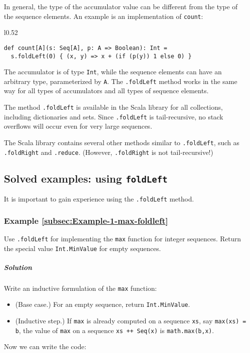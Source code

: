 In general, the type of the accumulator value can be different from
the type of the sequence elements. An example is an implementation
of \lstinline!count!:

\begin{wrapfigure}{l}{0.52\columnwidth}%
\vspace{-0.5\baselineskip}
\begin{lstlisting}
def count[A](s: Seq[A], p: A => Boolean): Int =
  s.foldLeft(0) { (x, y) => x + (if (p(y)) 1 else 0) }
\end{lstlisting}

\vspace{-0.75\baselineskip}
\end{wrapfigure}%

\noindent The accumulator is of type \lstinline!Int!, while the sequence
elements can have an arbitrary type, parameterized by \lstinline!A!.
The \lstinline!.foldLeft! method works in the same way for all types
of accumulators and all types of sequence elements.

The method \lstinline!.foldLeft! is available in the Scala library
for all collections, including dictionaries and sets. Since \lstinline!.foldLeft!
is tail-recursive, no stack overflows will occur even for very large
sequences.

The Scala library contains several other methods similar to \lstinline!.foldLeft!,
such as \lstinline!.foldRight! and \lstinline!.reduce!. (However,
\lstinline!.foldRight! is not tail-recursive!)

\subsection{Solved examples: using \texttt{foldLeft}}

It is important to gain experience using the \lstinline!.foldLeft!
method.

\subsubsection{Example \label{subsec:Example-1-max-foldleft}\ref{subsec:Example-1-max-foldleft}}

Use \lstinline!.foldLeft! for implementing the \lstinline!max! function
for integer sequences. Return the special value \lstinline!Int.MinValue!
for empty sequences.

\subparagraph{Solution}

Write an inductive formulation of the \lstinline!max! function:
\begin{itemize}
\item (Base case.) For an empty sequence, return \lstinline!Int.MinValue!.
\item (Inductive step.) If \lstinline!max! is already computed on a sequence
\lstinline!xs!, say \lstinline!max(xs) = b!, the value of \lstinline!max!
on a sequence \lstinline!xs ++ Seq(x)! is \lstinline!math.max(b,x)!. 
\end{itemize}
Now we can write the code:

